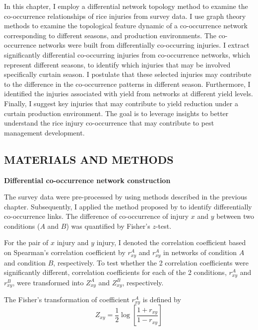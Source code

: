 In this chapter, I employ a differential network topology method to examine the co-occurrence relationships of rice injuries from survey data. I use graph theory methods to examine the topological feature dynamic of a co-occurrence network corresponding to different seasons, and production environments. The co-occurrence networks were built from differentially co-occurring injuries. I extract significantly differential co-occurring injuries from co-occurrence networks, which represent different seasons, to identify which injuries that may be involved specifically curtain season. I postulate that these selected injuries may contribute to the difference in the co-occurrence patterns in different season. Furthermore, I identified the injuries associated with yield from networks at different yield levels. Finally, I suggest key injuries that may contribute to yield reduction under a curtain production environment. The goal is to leverage insights to better understand the rice injury co-occurrence that may contribute to pest management development.

\newpage
\subsection{MATERIALS AND METHODS}

\textbf{Differential co-occurrence network construction}

The survey data were pre-processed by using methods described in the previous chapter. Subsequently, I applied the method proposed by \citet{Fukushima_2013_Diffcorr} to identify differentially co-occurrence links. The difference of co-occurrence of injury $x$ and $y$ between two conditions ($A$ and $B$) was quantified by Fisher's $z$-test.
 
For the pair of $x$ injury and $y$ injury, I denoted the correlation coefficient based on Spearman's correlation coefficient by $r_{xy}^A$ and $r_{xy}^A$ in networks of condition $A$ and condition $B$, respectively. To test whether the 2 correlation coefficients were significantly different, correlation coefficients for each of the 2 conditions, $r_{xy}^A$ and $r_{xy}^B$, were transformed into $Z_{xy}^A$ and $Z_{xy}^B$, respectively.


The Fisher's transformation of coefficient $r_{xy}^A$ is defined by
\begin{equation}
\label{eq:zvalue}
Z_{xy} = \frac{1}{2} \log\left[{\frac{1 + r_{xy}}{1 - r_{xy}}}\right]
\end{equation}

